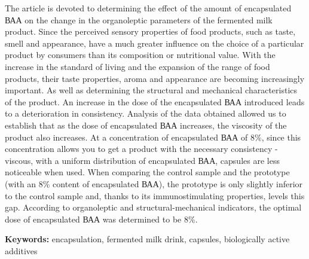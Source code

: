 The article is devoted to determining the effect of the amount of
encapsulated ВАА on the change in the organoleptic parameters of the
fermented milk product. Since the perceived sensory properties of food
products, such as taste, smell and appearance, have a much greater
influence on the choice of a particular product by consumers than its
composition or nutritional value. With the increase in the standard of
living and the expansion of the range of food products, their taste
properties, aroma and appearance are becoming increasingly important. As
well as determining the structural and mechanical characteristics of the
product. An increase in the dose of the encapsulated ВАА introduced
leads to a deterioration in consistency. Analysis of the data obtained
allowed us to establish that as the dose of encapsulated ВАА increases,
the viscosity of the product also increases. At a concentration of
encapsulated ВАА of 8\%, since this concentration allows you to get a
product with the necessary consistency - viscous, with a uniform
distribution of encapsulated ВАА, capsules are less noticeable when
used. When comparing the control sample and the prototype (with an 8\%
content of encapsulated ВАА), the prototype is only slightly inferior to
the control sample and, thanks to its immunostimulating properties,
levels this gap. According to organoleptic and structural-mechanical
indicators, the optimal dose of encapsulated ВАА was determined to be
8\%.

{\bfseries Keywords:} encapsulation, fermented milk drink, capsules,
biologically active additives


